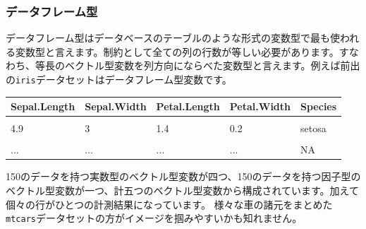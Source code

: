 \documentclass[
  12pt,
]{book}
\begin{document}
\hypertarget{ux30c7ux30fcux30bfux30d5ux30ecux30fcux30e0ux578b}{%
\subsubsection{データフレーム型}\label{ux30c7ux30fcux30bfux30d5ux30ecux30fcux30e0ux578b}}

データフレーム型はデータベースのテーブルのような形式の変数型で最も使われる変数型と言えます。制約として全ての列の行数が等しい必要があります。すなわち、等長のベクトル型変数を列方向にならべた変数型と言えます。例えば前出の\texttt{iris}データセットはデータフレーム型変数です。

\begin{table}[H]
\centering
\begin{tabular}[t]{lllll}
\toprule
Sepal.Length & Sepal.Width & Petal.Length & Petal.Width & Species\\
\midrule
\cellcolor{gray!6}{5.1} & \cellcolor{gray!6}{3.5} & \cellcolor{gray!6}{1.4} & \cellcolor{gray!6}{0.2} & \cellcolor{gray!6}{setosa}\\
4.9 & 3 & 1.4 & 0.2 & setosa\\
\cellcolor{gray!6}{4.7} & \cellcolor{gray!6}{3.2} & \cellcolor{gray!6}{1.3} & \cellcolor{gray!6}{0.2} & \cellcolor{gray!6}{setosa}\\
... & ... & ... & ... & NA\\
\bottomrule
\end{tabular}
\end{table}

150のデータを持つ実数型のベクトル型変数が四つ、150のデータを持つ因子型のベクトル型変数が一つ、計五つのベクトル型変数から構成されています。加えて個々の行がひとつの計測結果になっています。 様々な車の諸元をまとめた\texttt{mtcars}データセットの方がイメージを掴みやすいかも知れません。

\begin{table}[H]
\centering
{}
\end{table}
\end{document}
